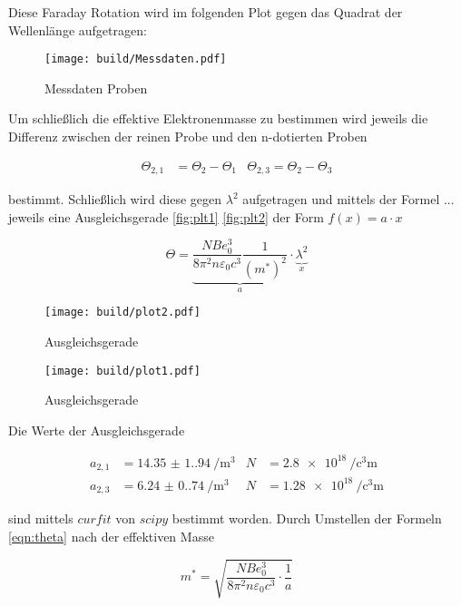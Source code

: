 Diese Faraday Rotation wird im folgenden Plot gegen das Quadrat der Wellenlänge aufgetragen: 

\begin{figure}[H]
	\centering
	\texttt{[image: build/Messdaten.pdf]}
	\caption{Messdaten Proben}\label{fig:Aufbau}
\end{figure}

Um schließlich die effektive Elektronenmasse zu bestimmen wird jeweils die Differenz zwischen der reinen Probe und den n-dotierten Proben

\begin{align*}
    \Theta_{2,1}&=\Theta_2-\Theta_1  & \Theta_{2,3}=\Theta_2-\Theta_3
\end{align*}

bestimmt.
Schließlich wird diese gegen $\lambda^2$ aufgetragen und mittels der Formel ... jeweils eine Ausgleichsgerade \eqref{fig:plt1} \eqref{fig:plt2} der Form $f(x)=a\cdot x$

\begin{equation}
    \Theta=\underbrace{\frac{NBe_0^3}{8 \pi^2 n \varepsilon_0 c^3} \frac{1}{(m^{\ast})^2}}_{a} \cdot \underbrace{\lambda^2}_{x}
    \label{eqn:theta}
\end{equation}

\begin{figure}[H]
	\centering
	\texttt{[image: build/plot2.pdf]}
	\caption{Ausgleichsgerade}\label{fig:plt1}
\end{figure}

\begin{figure}[H]
	\centering
	\texttt{[image: build/plot1.pdf]}
	\caption{Ausgleichsgerade}\label{fig:plt2}
\end{figure}

Die Werte der Ausgleichsgerade 

\begin{align}
    a_{2,1}&=\qty{14.35(1.94)}{\per\cubic\meter} & N&=\qty{2.8e18}{\per\cubic\centi\meter}\\
    a_{2,3}&=\qty{6.24(0.74)}{\per\cubic\meter}  & N&=\qty{1.28e18}{\per\cubic\centi\meter}
\end{align}

sind mittels $curfit$ von $scipy$ \cite{scipy} bestimmt worden.
Durch Umstellen der Formeln \eqref{eqn:theta} nach der effektiven Masse

\begin{equation}
    m^{\ast}=\sqrt{\frac{NBe_0^3}{8 \pi^2 n \varepsilon_0 c^3} \cdot \frac{1}{a}}
\end{equation}

